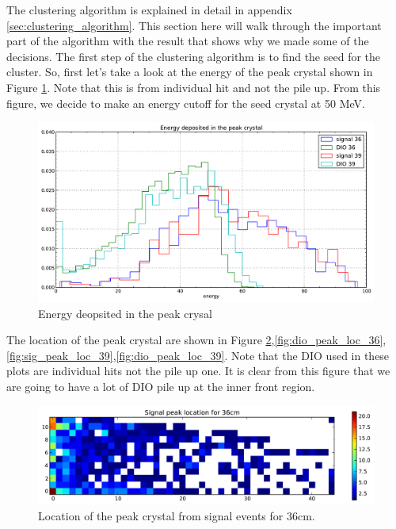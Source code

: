 \documentclass[11pt]{article}
\begin{document}
The clustering algorithm is explained in detail in appendix \ref{sec:clustering_algorithm}. This section here will walk through the important part of the algorithm with the result that shows why we made some of the decisions. The first step of the clustering algorithm is to find the seed for the cluster. So, first let's take a look at the energy of the peak crystal shown in Figure \ref{fig:e_peak}. Note that this is from individual hit and not the pile up. From this figure, we decide to make an energy cutoff for the seed crystal at 50 MeV. 
\begin{figure}[htbp]
   \centering
   \includegraphics[width=\textwidth]{../plot/E_peak.pdf} %
   \caption{Energy deopsited in the peak crysal}
   \label{fig:e_peak}
\end{figure}

The location of the peak crystal are shown in Figure \ref{fig:sig_peak_loc_36},\ref{fig:dio_peak_loc_36}, \ref{fig:sig_peak_loc_39},\ref{fig:dio_peak_loc_39}. Note that the DIO used in these plots are individual hits not the pile up one. It is clear from this figure that we are going to have a lot of DIO pile up at the inner front region.

\begin{figure}[htbp]
   \centering
   \includegraphics[width=\textwidth]{../plot/sig_peak_loc_36.pdf} %
   \caption{Location of the peak crystal from signal events for 36cm.}
   \label{fig:sig_peak_loc_36}
\end{figure}
\end{document}
